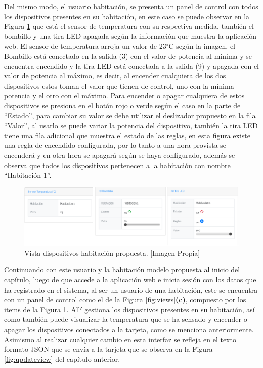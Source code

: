 Del mismo modo, el usuario habitación, se presenta un panel de control con todos los dispositivos presentes en su habitación, en este caso se puede observar en la Figura \ref{fig:r_app} que está el sensor de temperatura con su respectiva medida, también el bombillo y una tira LED apagada según la información que muestra la aplicación web. El sensor de temperatura arroja un valor de 23$^{\circ}$C según la imagen, el Bombillo está conectado en la salida (3) con el valor de potencia al mínima y se encuentra encendido y la tira LED está conectada a la salida (9) y apagada con el valor de potencia al máximo, es decir, al encender cualquiera de los dos dispositivos estos toman el valor que tienen de control, uno con la mínima potencia y el otro con el máximo. Para encender o apagar cualquiera de estos dispositivos se presiona en el botón rojo o verde según el caso en la parte de ``Estado'', para cambiar su valor se debe utilizar el deslizador propuesto en la fila ``Valor'', al usarlo se puede variar la potencia del dispositivo, también la tira LED tiene una fila adicional que muestra el estado de las reglas, en esta figura existe una regla de encendido configurada, por lo tanto a una hora provista se encenderá y en otra hora se apagará según se haya configurado, además se observa que todos los dispositivos pertenecen a la habitación con nombre ``Habitación 1''.

\begin{figure}[!t]
	\centering
	\caption[Vista dispositivos habitación propuesta.]{Vista dispositivos habitación propuesta. [Imagen Propia]}
	\label{fig:r_app}
	\includegraphics[width=\linewidth]{Imagenes/R_app}
\end{figure}

Continuando con este usuario y la habitación modelo propuesta al inicio del capítulo, luego de que accede a la aplicación web e inicia sesión con los datos que ha registrado en el sistema, al ser un usuario de una habitación, este se encuentra con un panel de control como el de la Figura \ref{fig:views}\textbf{(c)}, compuesto por los items de la Figura \ref{fig:r_app}. Allí gestiona los dispositivos presentes en su habitación, así como también puede visualizar la temperatura que se ha sensado y encender o apagar los dispositivos conectados a la tarjeta, como se menciona anteriormente. Asimismo al realizar cualquier cambio en esta interfaz se refleja en el texto formato JSON que se envía a la tarjeta que se observa en la Figura \ref{fig:updateview} del capítulo anterior.\\

